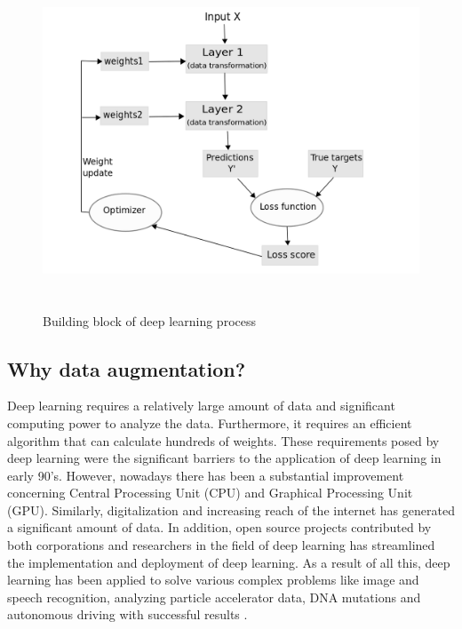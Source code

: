 \begin{figure}[ht]
	\begin{center}
		\includegraphics[width=12cm,height=10cm,keepaspectratio]{images/deep_learning_basics.png}
		\caption{Building block of deep learning process }
		\label{fig:deep learning architecture}
	\end{center}
\end{figure}

\subsection{Why data augmentation?}

Deep learning requires a relatively large amount of data and significant computing power to analyze the data. Furthermore, it  requires an efficient algorithm that can calculate hundreds of weights. These requirements posed by deep learning were the significant barriers to the application of deep learning in early 90's. However, nowadays there has been a substantial improvement concerning Central Processing Unit (CPU) and Graphical Processing Unit (GPU). Similarly, digitalization and increasing reach of the internet has generated a significant amount of data. In addition, open source projects contributed by both corporations and researchers in the field of deep learning has streamlined the implementation and deployment of deep learning. As a result of all this, deep learning has been applied to solve various complex problems like image and speech recognition, analyzing particle accelerator data, DNA mutations and autonomous driving with successful results \citep{lecun2015deep}. 

